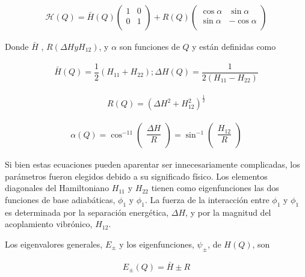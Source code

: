 \documentclass[12pt]{report}
\begin{document}
\begin{align}
\mathcal{H}(Q)= \bar{H}(Q)
\left(
\begin{matrix}
1 & 0  \\
0 & 1  \\
\end{matrix}
\right)
+R(Q)
\left(
\begin{matrix}
\cos \alpha & \sin \alpha  \\
\sin \alpha & -\cos \alpha \\
\end{matrix}
\right)
\label{ic7}
\end{align}

Donde $\bar{H}$ , $R(\Delta H y H_{12} )$, y $\alpha$ son funciones de $Q$ y están definidas como

\begin{align}
\bar{H}(Q)=\dfrac{1}{2}(H_{11}+H_{22}); \Delta H (Q)=\dfrac{1}{2(H_{11}-H_{22})}
\label{ic8}
\end{align}

\begin{align}
R(Q)=(\Delta H^2+H_{12}^2)^{\frac{1}{2}}
\label{ic9}
\end{align}

\begin{align}
\alpha(Q)= \cos^{-11}
\left(
\begin{matrix}
\dfrac{\Delta H }{R}  \\
\end{matrix}
\right)
=\sin^{-1}
\left(
\begin{matrix}
\dfrac{H_{12}}{R}  \\
\end{matrix}
\right)
\end{align}

Si bien estas ecuaciones pueden aparentar ser innecesariamente complicadas, los parámetros fueron elegidos debido a su significado físico. Los elementos diagonales del Hamiltoniano $H_{11}$ y $H_{22}$ tienen como eigenfunciones las dos funciones de base adiabáticas, $\phi_1$  y $\phi_1$. La fuerza de la interacción entre  $\phi_1$  y $\phi_1$ es determinada por la separación energética, $\Delta H$, y por la magnitud del acoplamiento vibrónico, $H_{12}$.


\newpage
Los eigenvalores generales, $E_\pm$ y los eigenfunciones, $\psi_\pm$, de $H(Q)$, son

\begin{align}
E_{\pm}(Q)=\bar{H}\pm R
\end{align}
\end{document}

